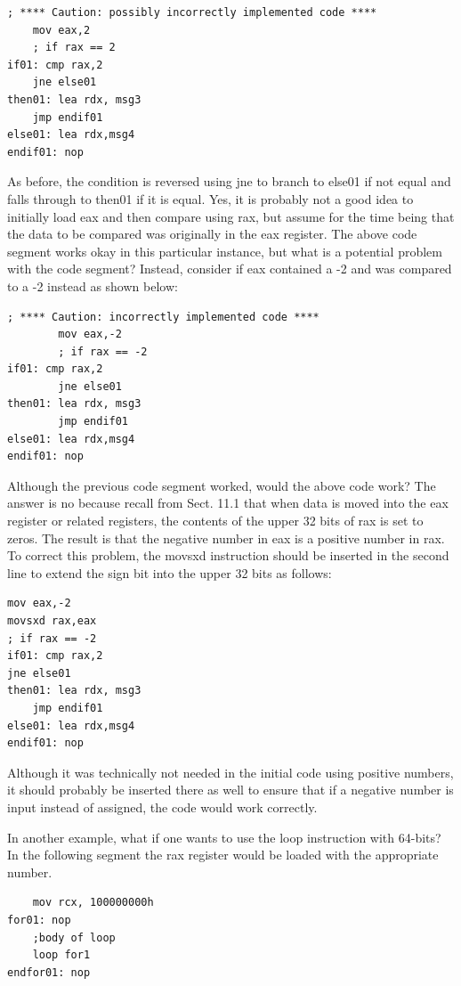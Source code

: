 \documentclass[10pt]{book}
\begin{document}
\begin{center}
\begin{center}
\begin{center}
\begin{center}
\begin{verbatim}
; **** Caution: possibly incorrectly implemented code ****
    mov eax,2
    ; if rax == 2
if01: cmp rax,2
    jne else01
then01: lea rdx, msg3
    jmp endif01
else01: lea rdx,msg4
endif01: nop
\end{verbatim}

As before, the condition is reversed using jne to branch to else01 if not equal and falls through to then01 if it is equal. Yes, it is probably not a good idea to initially load eax and then compare using rax, but assume for the time being that the data to be compared was originally in the eax register. The above code segment works okay in this particular instance, but what is a potential problem with the code segment? Instead, consider if eax contained a -2 and was compared to a -2 instead as shown below:

\begin{verbatim}
; **** Caution: incorrectly implemented code ****
        mov eax,-2
        ; if rax == -2
if01: cmp rax,2
        jne else01
then01: lea rdx, msg3
        jmp endif01
else01: lea rdx,msg4
endif01: nop
\end{verbatim}

Although the previous code segment worked, would the above code work? The answer is no because recall from Sect. 11.1 that when data is moved into the eax register or related registers, the contents of the upper 32 bits of rax is set to zeros. The result is that the negative number in eax is a positive number in rax. To correct this problem, the movsxd instruction should be inserted in the second line to extend the sign bit into the upper 32 bits as follows:


\begin{verbatim}
mov eax,-2
movsxd rax,eax
; if rax == -2
if01: cmp rax,2
jne else01
then01: lea rdx, msg3
    jmp endif01
else01: lea rdx,msg4
endif01: nop
\end{verbatim}

Although it was technically not needed in the initial code using positive numbers, it should probably be inserted there as well to ensure that if a negative number is input instead of assigned, the code would work correctly.

In another example, what if one wants to use the loop instruction with 64-bits? In the following segment the rax register would be loaded with the appropriate number.

\begin{verbatim}
    mov rcx, 100000000h
for01: nop
    ;body of loop
    loop for1
endfor01: nop
\end{verbatim}


\end{center}
\end{center}
\end{center}
\end{center}
\end{document}
